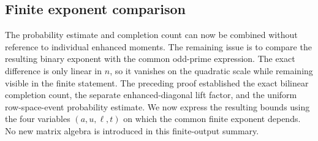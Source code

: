 \documentclass[11pt]{article}
\newcommand{\1}{\mathbf 1}
\theoremstyle{plain}
\theoremstyle{definition}
\theoremstyle{remark}
\begin{document}
\subsection{Finite exponent comparison}
The probability estimate and completion count can now be combined without reference to individual enhanced moments.  The remaining issue is to compare the resulting binary exponent with the common odd-prime expression.  The exact difference is only linear in $n$, so it vanishes on the quadratic scale while remaining visible in the finite statement.
The preceding proof established the exact bilinear completion count, the
separate enhanced-diagonal lift factor, and the uniform row-space-event
probability estimate.  We now express the resulting bounds using the four variables
$(a,u,\ell,t)$ on which the common finite exponent depends.  No new matrix algebra is
introduced in this finite-output summary.
\end{document}
